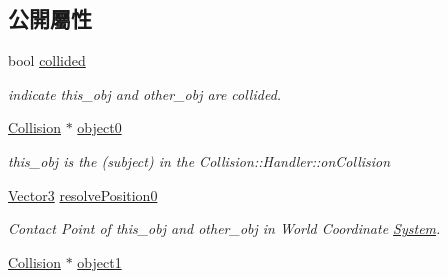 \subsection*{公開屬性}
\begin{DoxyCompactItemize}
\item 
bool \hyperlink{class_magnum_1_1_collision_1_1_contact_info_ad82e8acb76c7b4c53edeb3df0b486ef6}{collided}\hypertarget{class_magnum_1_1_collision_1_1_contact_info_ad82e8acb76c7b4c53edeb3df0b486ef6}{}\label{class_magnum_1_1_collision_1_1_contact_info_ad82e8acb76c7b4c53edeb3df0b486ef6}

\begin{DoxyCompactList}\small\item\em indicate this\+\_\+obj and other\+\_\+obj are collided. \end{DoxyCompactList}\item 
\hyperlink{class_magnum_1_1_collision}{Collision} $\ast$ \hyperlink{class_magnum_1_1_collision_1_1_contact_info_a35abe0be201e829ab2d46a2f035dfa41}{object0}\hypertarget{class_magnum_1_1_collision_1_1_contact_info_a35abe0be201e829ab2d46a2f035dfa41}{}\label{class_magnum_1_1_collision_1_1_contact_info_a35abe0be201e829ab2d46a2f035dfa41}

\begin{DoxyCompactList}\small\item\em this\+\_\+obj is the (subject) in the Collision\+::\+Handler\+::on\+Collision \end{DoxyCompactList}\item 
\hyperlink{class_magnum_1_1_vector3}{Vector3} \hyperlink{class_magnum_1_1_collision_1_1_contact_info_a5f116b8799ac71a4a7a190f4318bc8aa}{resolve\+Position0}\hypertarget{class_magnum_1_1_collision_1_1_contact_info_a5f116b8799ac71a4a7a190f4318bc8aa}{}\label{class_magnum_1_1_collision_1_1_contact_info_a5f116b8799ac71a4a7a190f4318bc8aa}

\begin{DoxyCompactList}\small\item\em Contact Point of this\+\_\+obj and other\+\_\+obj in World Coordinate \hyperlink{class_magnum_1_1_system}{System}. \end{DoxyCompactList}\item 
\hyperlink{class_magnum_1_1_collision}{Collision} $\ast$ \hyperlink{class_magnum_1_1_collision_1_1_contact_info_a35705dc324b7a95c362c09e1e330ea4f}{object1}\hypertarget{class_magnum_1_1_collision_1_1_contact_info_a35705dc324b7a95c362c09e1e330ea4f}{}\label{class_magnum_1_1_collision_1_1_contact_info_a35705dc324b7a95c362c09e1e330ea4f}


\end{DoxyCompactItemize}
